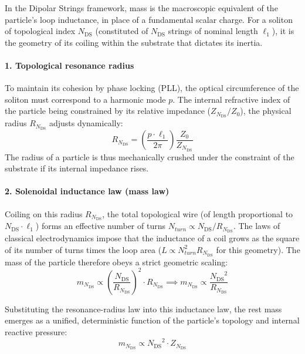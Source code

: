 \documentclass[11pt,a4paper]{article}
\theoremstyle{plain}
\theoremstyle{remark}
\newcommand{\Ncd}{\ensuremath{N_{\mathrm{DS}}}}
\begin{document}
In the Dipolar Strings framework, mass is the macroscopic equivalent of the particle's loop inductance, in place of a fundamental scalar charge. For a soliton of topological index $\Ncd$ (constituted of $\Ncd$ strings of nominal length $\ell_1$), it is the geometry of its coiling within the substrate that dictates its inertia.

\paragraph{1. Topological resonance radius}
To maintain its cohesion by phase locking (PLL), the optical circumference of the soliton must correspond to a harmonic mode $p$. The internal refractive index of the particle being constrained by its relative impedance ($Z_{\Ncd}/Z_0$), the physical radius $R_{\Ncd}$ adjusts dynamically:
\begin{equation}\label{eq:resonance_radius}
R_{\Ncd} = \left( \frac{p \cdot \ell_1}{2\pi} \right) \frac{Z_0}{Z_{\Ncd}}
\end{equation}
The radius of a particle is thus mechanically crushed under the constraint of the substrate if its internal impedance rises.

\paragraph{2. Solenoidal inductance law (mass law)}
Coiling on this radius $R_{\Ncd}$, the total topological wire (of length proportional to $\Ncd \cdot \ell_1$) forms an effective number of turns $N_{turn} \propto \Ncd/R_{\Ncd}$. The laws of classical electrodynamics impose that the inductance of a coil grows as the square of its number of turns times the loop area ($L \propto N_{turn}^2 R_{\Ncd}$ for this geometry). The mass of the particle therefore obeys a strict geometric scaling:
\begin{equation}\label{eq:solenoid_mass}
m_{\Ncd} \propto \left( \frac{\Ncd}{R_{\Ncd}} \right)^2 \cdot R_{\Ncd} \implies m_{\Ncd} \propto \frac{\Ncd^2}{R_{\Ncd}}
\end{equation}

Substituting the resonance-radius law into this inductance law, the rest mass emerges as a unified, deterministic function of the particle's topology and internal reactive pressure:
\begin{equation}\label{eq:mass_topo}
m_{\Ncd} \propto \Ncd^2 \cdot Z_{\Ncd}
\end{equation}
\end{document}
